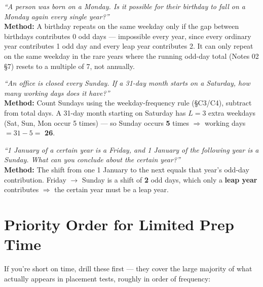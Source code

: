 \documentclass[11pt]{article}
\begin{document}
\begin{examplebox}
\emph{``A person was born on a Monday. Is it possible for their birthday to fall on a Monday again
every single year?''} \\
\textbf{Method:} A birthday repeats on the same weekday only if the gap between birthdays
contributes 0 odd days --- impossible every year, since every ordinary year contributes 1 odd day
and every leap year contributes 2. It can only repeat on the same weekday in the rare years where
the running odd-day total (Notes 02 \S7) resets to a multiple of 7, not annually.
\end{examplebox}

\begin{examplebox}
\emph{``An office is closed every Sunday. If a 31-day month starts on a Saturday, how many working
days does it have?''} \\
\textbf{Method:} Count Sundays using the weekday-frequency rule (\S C3/C4), subtract from total
days. A 31-day month starting on Saturday has $L=3$ extra weekdays (Sat, Sun, Mon occur 5 times) ---
so Sunday occurs \textbf{5} times $\Rightarrow$ working days $= 31-5 = $ \textbf{26}.
\end{examplebox}

\begin{examplebox}
\emph{``1 January of a certain year is a Friday, and 1 January of the following year is a Sunday.
What can you conclude about the certain year?''} \\
\textbf{Method:} The shift from one 1 January to the next equals that year's odd-day contribution.
Friday $\to$ Sunday is a shift of \textbf{2} odd days, which only a \textbf{leap year} contributes
$\Rightarrow$ the certain year must be a leap year.
\end{examplebox}

\section{Priority Order for Limited Prep Time}

If you're short on time, drill these first --- they cover the large majority of what actually
appears in placement tests, roughly in order of frequency:
\end{document}
